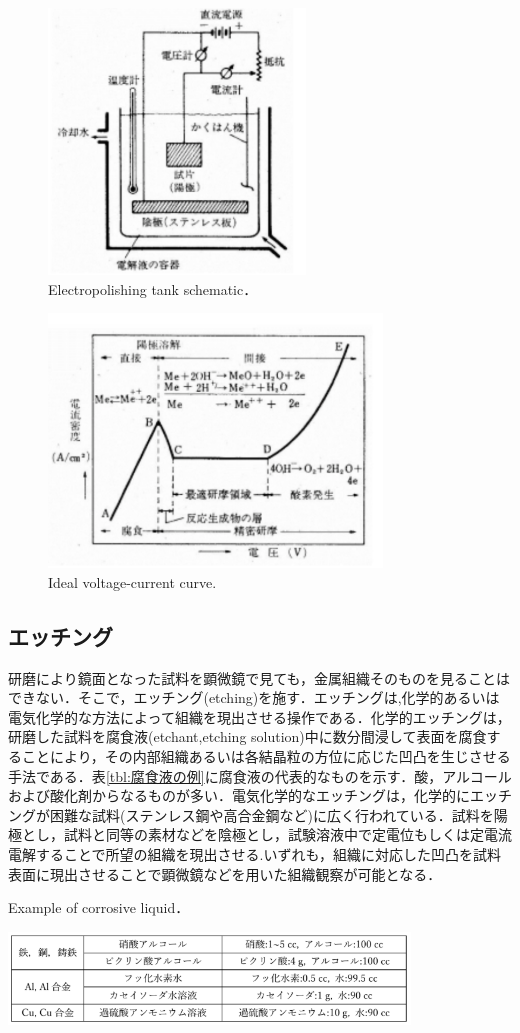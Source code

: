 \begin{figure}[htbp]
    \centering %
    \includegraphics[width=100truemm,clip]{fig/fig_電解研磨槽概略図.png}
    \caption{Electropolishing tank schematic．}
    \label{fig:電解研磨槽概略図}
\end{figure}

\begin{figure}[htbp]
    \centering %
    \includegraphics[width=100truemm,clip]{fig/fig_理想的な電圧電流.png}
    \caption{Ideal voltage-current curve.}
    \label{fig:理想的な電圧電流}
\end{figure}

\subsection{エッチング}
研磨により鏡面となった試料を顕微鏡で見ても，金属組織そのものを見ることはできない．そこで，エッチング(etching)を施す．エッチングは,化学的あるいは電気化学的な方法によって組織を現出させる操作である．化学的エッチングは，研磨した試料を腐食液(etchant,etching solution)中に数分間浸して表面を腐食することにより，その内部組織あるいは各結晶粒の方位に応じた凹凸を生じさせる手法である．表\ref{tbl:腐食液の例}に腐食液の代表的なものを示す．酸，アルコールおよび酸化剤からなるものが多い．電気化学的なエッチングは，化学的にエッチングが困難な試料(ステンレス鋼や高合金鋼など)に広く行われている．試料を陽極とし，試料と同等の素材などを陰極とし，試験溶液中で定電位もしくは定電流電解することで所望の組織を現出させる.いずれも，組織に対応した凹凸を試料表面に現出させることで顕微鏡などを用いた組織観察が可能となる．

\begin{table}[htbp]
    \centering
    \caption{Example of corrosive liquid．} %
    \label{tbl:腐食液の例} %
    \includegraphics[width=0.8\textwidth]{fig/tbl_腐食液の例.png} %
\end{table}